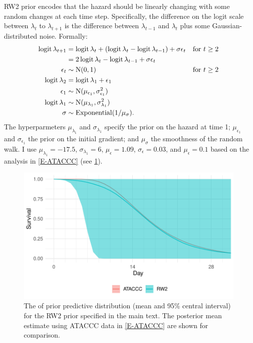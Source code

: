 \documentclass[thesis.tex]{subfiles}
\begin{document}
RW2 prior encodes that the hazard should be linearly changing with some random changes at each time step.
Specifically, the difference on the logit scale between $\lambda_t$ to $\lambda_{t+1}$ is the difference between $\lambda_{t-1}$ and $\lambda_t$ plus some Gaussian-distributed noise.
Formally:
\begin{align}
  \operatorname{logit}\lambda_{t+1}
  &= \operatorname{logit}\lambda_t + (\operatorname{logit}\lambda_t - \operatorname{logit}\lambda_{t-1}) + \sigma \epsilon_t &\text{for $t \geq 2$} \\
  &= 2\operatorname{logit}\lambda_t - \operatorname{logit}\lambda_{t-1} + \sigma \epsilon_t \\
  \epsilon_t &\sim \operatorname{N}(0, 1) &\text{for $t \geq 2$}  \\
  \operatorname{logit}\lambda_2 &= \operatorname{logit}\lambda_1 + \epsilon_1 \\\
  \epsilon_1 &\sim \operatorname{N}(\mu_{\epsilon_1}, \sigma_{\epsilon_1}^2) \\
  \operatorname{logit} \lambda_1 &\sim \operatorname{N}(\mu_{\lambda_1}, \sigma_{\lambda_1}^2) \\
  \sigma &\sim \operatorname{Exponential}(1/\mu_\sigma).
\end{align}
The hyperparmeters $\mu_{\lambda_1}$ and $\sigma_{\lambda_1}$ specify the prior on the hazard at time 1; $\mu_{\epsilon_1}$ and $\sigma_{\epsilon_1}$ the prior on the initial gradient; and $\mu_\sigma$ the smoothness of the random walk.
I use $\mu_{\lambda_1} = -17.5$, $\sigma_{\lambda_1} = 6$, $\mu_\epsilon = 1.09$, $\sigma_\epsilon = 0.03$, and $\mu_\epsilon = 0.1$ based on the analysis in \cref{E-ATACCC} (see \cref{perf-test:fig:rw2-prior}).
\begin{figure}
  \centering \includegraphics{cis-perfect-testing/rw2-prior}
  \caption[RW2 prior for the hazard]{The of prior predictive distribution (mean and 95\% central interval) for the RW2 prior specified in the main text. The posterior mean estimate using ATACCC data in \cref{E-ATACCC} are shown for comparison. \label{perf-test:fig:rw2-prior}}
\end{figure}
\end{document}
